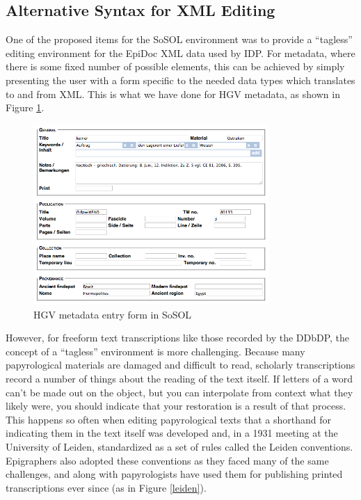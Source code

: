 \documentclass[]{article}
\begin{document}
\subsection*{Alternative Syntax for XML Editing}

One of the proposed items for the SoSOL environment was to provide a “tagless” editing environment for the EpiDoc XML data used by IDP. For metadata, where there is some fixed number of possible elements, this can be achieved by simply presenting the user with a form specific to the needed data types which translates to and from XML. This is what we have done for HGV metadata, as shown in Figure \ref{hgvmeta}.

\begin{figure}[!h]
  \centering
  \includegraphics[width=0.8\textwidth]{images/hgvmeta.png}
  \caption{HGV metadata entry form in SoSOL\label{hgvmeta}}
\end{figure}

However, for freeform text transcriptions like those recorded by the DDbDP, the concept of a “tagless” environment is more challenging. Because many papyrological materials are damaged and difficult to read, scholarly transcriptions record a number of things about the reading of the text itself. If letters of a word can't be made out on the object, but you can interpolate from context what they likely were, you should indicate that your restoration is a result of that process. This happens so often when editing papyrological texts that a shorthand for indicating them in the text itself was developed  and, in a 1931 meeting at the University of Leiden, standardized as a set of rules called the Leiden conventions. Epigraphers also adopted these conventions as they faced many of the same challenges, and along with papyrologists have used them for publishing printed transcriptions ever since (as in Figure \ref{leiden}).
\end{document}
